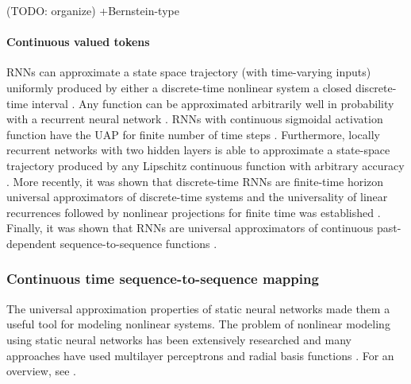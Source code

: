 \documentclass{article}
\newcommand{\ascomment}[1]{\textcolor{ascolor}{(#1)}}
\newcounter{ct}
\begin{document}
\ascomment{TODO: organize} 
 \citep{moore1990unpredictability,moore1998finite}
 \citep{cabessa2019turing}
 \citep{perez2019turing}
 \citep{chung2021turing}
 \citep{perez2021attention}
 \citep{giannou2023looped}
 \citep{stogin2024provably}
  \citep{nowak2023representational, nowak2024representational}
+Bernstein-type  \citep{veeravalli2023nonlinear}


\paragraph{Continuous valued tokens}
RNNs can approximate a state space trajectory (with time-varying inputs) uniformly  produced by either a discrete-time nonlinear system a closed discrete-time interval  \citep{jin1995universal}.
Any function can be approximated arbitrarily well in probability with a recurrent neural network \citep{hammer2000approximation}.  %
RNNs with continuous sigmoidal activation function have the UAP for finite number of time steps  \citep{schafer2006recurrent, schafer2007uap}.
Furthermore, locally recurrent networks with two hidden layers is able to approximate a state-space trajectory produced by any Lipschitz continuous function with arbitrary accuracy \citep{patan2008approximation}.
More recently, it was shown that discrete-time RNNs are finite-time horizon universal approximators of discrete-time systems  \citep{aguiar2023universal} and the universality of linear recurrences followed by nonlinear projections for finite time was established  \citep{orvieto2023universality}.
Finally, it was shown that RNNs are universal approximators of continuous past-dependent sequence-to-sequence functions  \citep{song2023minimal}.%





\subsubsection{Continuous time sequence-to-sequence mapping}
The universal approximation properties of static neural networks  \citep{funahashi1989approximate} made them a useful tool for modeling nonlinear systems. 
The problem of nonlinear modeling using static neural networks has been extensively researched  \citep{narendra1990identification,warwick1992neural} and many approaches have used multilayer perceptrons and radial basis functions  \citep{chen1992neural,choi1996constructive,tan1995efficient}. 
For an overview, see  \citet{garces2012strategies}.
\end{document}
